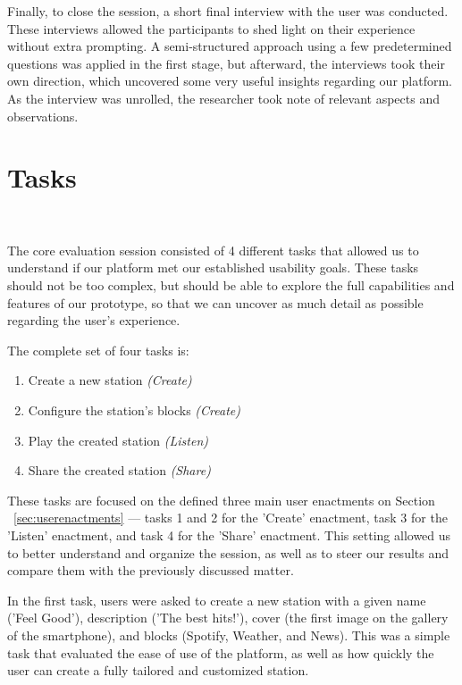 Finally, to close the session, a short final interview with the user was conducted. These interviews allowed the participants to shed light on their experience without extra prompting. A semi-structured approach using a few predetermined questions was applied in the first stage, but afterward, the interviews took their own direction, which uncovered some very useful insights regarding our platform. As the interview was unrolled, the researcher took note of relevant aspects and observations.

\section{Tasks}
~\label{sub:tasks}

The core evaluation session consisted of 4 different tasks that allowed us to understand if our platform met our established usability goals. These tasks should not be too complex, but should be able to explore the full capabilities and features of our prototype, so that we can uncover as much detail as possible regarding the user's experience.

The complete set of four tasks is:

\begin{enumerate}
	\item Create a new station \textit{(Create)}
	\item Configure the station's blocks \textit{(Create)}
	\item Play the created station \textit{(Listen)}
	\item Share the created station \textit{(Share)}
\end{enumerate}

These tasks are focused on the defined three main user enactments on Section ~\ref{sec:userenactments} — tasks 1 and 2 for the 'Create' enactment, task 3 for the 'Listen' enactment, and task 4 for the 'Share' enactment. This setting allowed us to better understand and organize the session, as well as to steer our results and compare them with the previously discussed matter.

In the first task, users were asked to create a new station with a given name ('Feel Good'), description ('The best hits!'), cover (the first image on the gallery of the smartphone), and blocks (Spotify, Weather, and News). This was a simple task that evaluated the ease of use of the platform, as well as how quickly the user can create a fully tailored and customized station.

